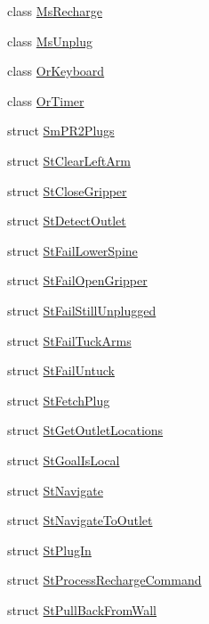 \begin{DoxyCompactItemize}
\item 
class \hyperlink{classsm__pr2__plugs_1_1MsRecharge}{Ms\+Recharge}
\item 
class \hyperlink{classsm__pr2__plugs_1_1MsUnplug}{Ms\+Unplug}
\item 
class \hyperlink{classsm__pr2__plugs_1_1OrKeyboard}{Or\+Keyboard}
\item 
class \hyperlink{classsm__pr2__plugs_1_1OrTimer}{Or\+Timer}
\item 
struct \hyperlink{structsm__pr2__plugs_1_1SmPR2Plugs}{Sm\+P\+R2\+Plugs}
\item 
struct \hyperlink{structsm__pr2__plugs_1_1StClearLeftArm}{St\+Clear\+Left\+Arm}
\item 
struct \hyperlink{structsm__pr2__plugs_1_1StCloseGripper}{St\+Close\+Gripper}
\item 
struct \hyperlink{structsm__pr2__plugs_1_1StDetectOutlet}{St\+Detect\+Outlet}
\item 
struct \hyperlink{structsm__pr2__plugs_1_1StFailLowerSpine}{St\+Fail\+Lower\+Spine}
\item 
struct \hyperlink{structsm__pr2__plugs_1_1StFailOpenGripper}{St\+Fail\+Open\+Gripper}
\item 
struct \hyperlink{structsm__pr2__plugs_1_1StFailStillUnplugged}{St\+Fail\+Still\+Unplugged}
\item 
struct \hyperlink{structsm__pr2__plugs_1_1StFailTuckArms}{St\+Fail\+Tuck\+Arms}
\item 
struct \hyperlink{structsm__pr2__plugs_1_1StFailUntuck}{St\+Fail\+Untuck}
\item 
struct \hyperlink{structsm__pr2__plugs_1_1StFetchPlug}{St\+Fetch\+Plug}
\item 
struct \hyperlink{structsm__pr2__plugs_1_1StGetOutletLocations}{St\+Get\+Outlet\+Locations}
\item 
struct \hyperlink{structsm__pr2__plugs_1_1StGoalIsLocal}{St\+Goal\+Is\+Local}
\item 
struct \hyperlink{structsm__pr2__plugs_1_1StNavigate}{St\+Navigate}
\item 
struct \hyperlink{structsm__pr2__plugs_1_1StNavigateToOutlet}{St\+Navigate\+To\+Outlet}
\item 
struct \hyperlink{structsm__pr2__plugs_1_1StPlugIn}{St\+Plug\+In}
\item 
struct \hyperlink{structsm__pr2__plugs_1_1StProcessRechargeCommand}{St\+Process\+Recharge\+Command}
\item 
struct \hyperlink{structsm__pr2__plugs_1_1StPullBackFromWall}{St\+Pull\+Back\+From\+Wall}

\end{DoxyCompactItemize}
